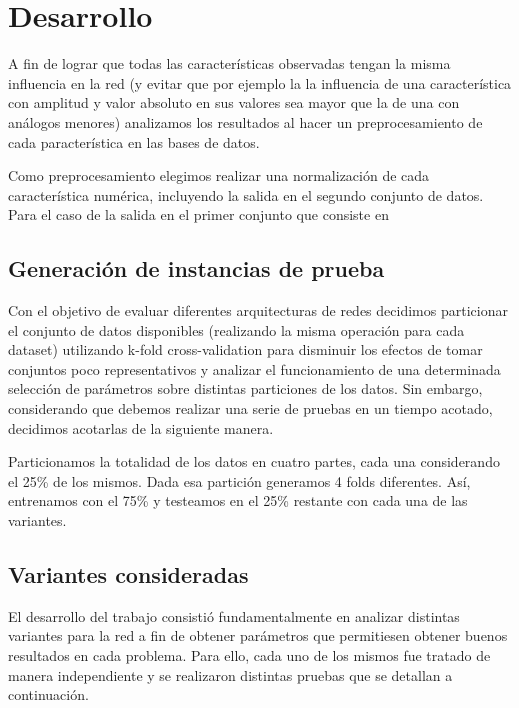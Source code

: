 \documentclass[informe.tex]{subfiles}
\begin{document}
  
  \section{Desarrollo}

  A fin de lograr que todas las características observadas tengan la misma influencia en la red (y evitar que por ejemplo la la influencia de una característica con amplitud y valor absoluto en sus valores sea mayor que la de una con análogos menores) analizamos los resultados al hacer un preprocesamiento de cada paracterística en las bases de datos.
  
  Como preprocesamiento elegimos realizar una normalización de cada característica numérica, incluyendo la salida en el segundo conjunto de datos. Para el caso de la salida en el primer conjunto que consiste en 
  
  
  
  
  
    \subsection{Generación de instancias de prueba}
    
      Con el objetivo de evaluar diferentes arquitecturas de redes decidimos particionar el conjunto de datos disponibles (realizando la misma operación para cada dataset) utilizando k-fold cross-validation para disminuir los efectos de tomar conjuntos poco representativos y analizar el funcionamiento de una determinada selección de parámetros sobre distintas particiones de los datos. Sin embargo, considerando que debemos realizar una serie de pruebas en un tiempo acotado, decidimos acotarlas de la siguiente manera.
      
      Particionamos la totalidad de los datos en cuatro partes, cada una considerando el 25\% de los mismos. Dada esa partición generamos 4 folds diferentes. Así, entrenamos con el 75\% y testeamos en el 25\% restante con cada una de las variantes.
      
    \subsection{Variantes consideradas}
    
      El desarrollo del trabajo consisti\'o fundamentalmente en analizar distintas variantes para la red a fin de obtener par\'ametros que permitiesen obtener buenos resultados en cada problema. Para ello, cada uno de los mismos fue tratado de manera independiente y se realizaron distintas pruebas que se detallan a continuaci\'on.
    
\end{document}
